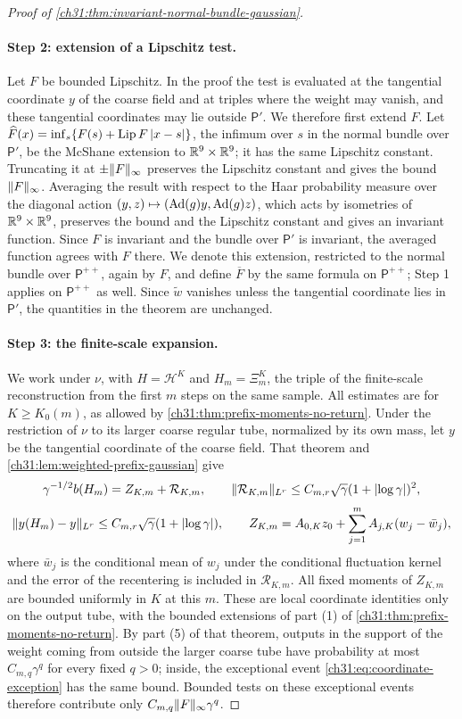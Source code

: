 \begin{proof}[Proof of \cref{ch31:thm:invariant-normal-bundle-gaussian}]
\paragraph{Step 2: extension of a Lipschitz test.}
Let $F$ be bounded Lipschitz. In the proof the test is evaluated at the tangential coordinate $y$ of the coarse field and at triples where the weight may vanish, and these tangential coordinates may lie outside $\mathsf P'$. We therefore first extend $F$. Let $\widehat F(x)=\inf_s\{F(s)+\operatorname{Lip} F\,\lvert x-s\rvert\}$, the infimum over $s$ in the normal bundle over $\mathsf P'$, be the McShane extension to $\mathbb R^9\times\mathbb R^9$; it has the same Lipschitz constant. Truncating it at $\pm\lVert F\rVert_\infty$ preserves the Lipschitz constant and gives the bound $\lVert F\rVert_\infty$. Averaging the result with respect to the Haar probability measure over the diagonal action $(y,z)\mapsto(\operatorname{Ad}(g)y,\operatorname{Ad}(g)z)$, which acts by isometries of $\mathbb R^9\times\mathbb R^9$, preserves the bound and the Lipschitz constant and gives an invariant function. Since $F$ is invariant and the bundle over $\mathsf P'$ is invariant, the averaged function agrees with $F$ there. We denote this extension, restricted to the normal bundle over $\mathsf P^{++}$, again by $F$, and define $\overline F$ by the same formula on $\mathsf P^{++}$; Step 1 applies on $\mathsf P^{++}$ as well. Since $\widetilde w$ vanishes unless the tangential coordinate lies in $\mathsf P'$, the quantities in the theorem are unchanged.

\paragraph{Step 3: the finite-scale expansion.}
We work under $\nu$, with $H=\mathcal H^K$ and $H_m=\Xi_m^K$, the triple of the finite-scale reconstruction from the first $m$ steps on the same sample. All estimates are for $K\ge K_0(m)$, as allowed by \cref{ch31:thm:prefix-moments-no-return}. Under the restriction of $\nu$ to its larger coarse regular tube, normalized by its own mass, let $y$ be the tangential coordinate of the coarse field. That theorem and \cref{ch31:lem:weighted-prefix-gaussian} give
\[
 \gamma^{-1/2}b(H_m)=Z_{K,m}+\mathcal R_{K,m},\qquad\lVert \mathcal R_{K,m}\rVert_{L^r}\le C_{m,r}\sqrt\gamma(1+\lvert \log\gamma\rvert)^2,
\]
\[
 \lVert y(H_m)-y\rVert_{L^r}\le C_{m,r}\sqrt\gamma(1+\lvert \log\gamma\rvert),\qquad Z_{K,m}=A_{0,K}z_0+\sum_{j=1}^mA_{j,K}(w_j-\bar w_j),
\]
where $\bar w_j$ is the conditional mean of $w_j$ under the conditional fluctuation kernel and the error of the recentering is included in $\mathcal R_{K,m}$. All fixed moments of $Z_{K,m}$ are bounded uniformly in $K$ at this $m$. These are local coordinate identities only on the output tube, with the bounded extensions of part (1) of \cref{ch31:thm:prefix-moments-no-return}. By part (5) of that theorem, outputs in the support of the weight coming from outside the larger coarse tube have probability at most $C_{m,q}\gamma^q$ for every fixed $q>0$; inside, the exceptional event \eqref{ch31:eq:coordinate-exception} has the same bound. Bounded tests on these exceptional events therefore contribute only $C_{m,q}\lVert F\rVert_\infty\gamma^q$.


\end{proof}
